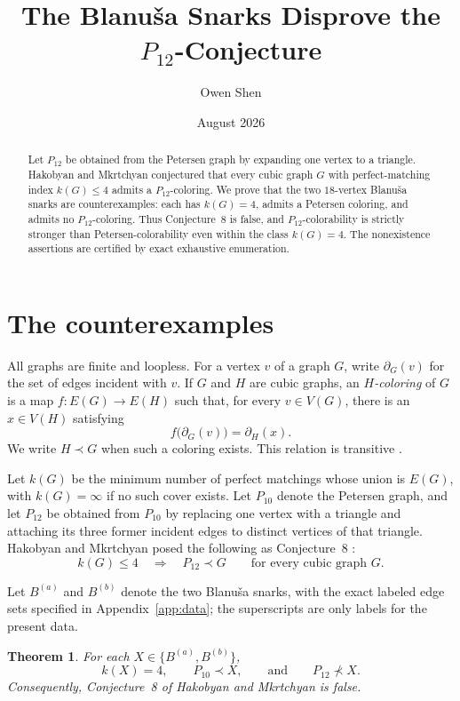 \documentclass[11pt]{amsart}
\title{The Blanu\v{s}a Snarks Disprove the
\texorpdfstring{$P_{12}$}{P12}-Conjecture}
\author{Owen Shen}
\date{August 2026}
\newtheorem{theorem}{Theorem}
\newcommand{\Pten}{P_{10}}
\newcommand{\Ptwelve}{P_{12}}
\newcommand{\Ba}{B^{(a)}}
\newcommand{\Bb}{B^{(b)}}
\begin{document}
\begin{abstract}
Let $P_{12}$ be obtained from the Petersen graph by expanding one vertex to a
triangle. Hakobyan and Mkrtchyan conjectured that every cubic graph $G$ with
perfect-matching index $k(G)\leq4$ admits a $P_{12}$-coloring. We prove that
the two $18$-vertex Blanu\v{s}a snarks are counterexamples: each has
$k(G)=4$, admits a Petersen coloring, and admits no $P_{12}$-coloring. Thus
Conjecture~8 is false, and $P_{12}$-colorability is strictly stronger than
Petersen-colorability even within the class $k(G)=4$. The nonexistence
assertions are certified by exact exhaustive enumeration.
\end{abstract}

\maketitle

\section{The counterexamples}

All graphs are finite and loopless. For a vertex $v$ of a graph $G$, write
$\partial_G(v)$ for the set of edges incident with $v$. If $G$ and $H$ are
cubic graphs, an \emph{$H$-coloring} of $G$ is a map
$f:E(G)\to E(H)$ such that, for every $v\in V(G)$, there is an
$x\in V(H)$ satisfying
\[
  f\bigl(\partial_G(v)\bigr)=\partial_H(x).
\]
We write $H\prec G$ when such a coloring exists. This relation is transitive
\cite{HakobyanMkrtchyan2019}.

Let $k(G)$ be the minimum number of perfect matchings whose union is $E(G)$,
with $k(G)=\infty$ if no such cover exists. Let $\Pten$ denote the Petersen
graph, and let $\Ptwelve$ be obtained from $\Pten$ by replacing one vertex
with a triangle and attaching its three former incident edges to distinct
vertices of that triangle. Hakobyan and Mkrtchyan posed the following as
Conjecture~8 \cite{HakobyanMkrtchyan2019}:
\begin{equation}\label{eq:HM}
  k(G)\leq 4 \quad\Longrightarrow\quad \Ptwelve\prec G
  \qquad\text{for every cubic graph }G.
\end{equation}

Let $\Ba$ and $\Bb$ denote the two Blanu\v{s}a snarks, with the exact labeled
edge sets specified in Appendix~\ref{app:data}; the superscripts are only
labels for the present data.

\begin{theorem}\label{thm:main}
For each $X\in\{\Ba,\Bb\}$,
\[
  k(X)=4,\qquad \Pten\prec X,\qquad\text{and}\qquad
  \Ptwelve\not\prec X.
\]
Consequently, Conjecture~8 of Hakobyan and Mkrtchyan is false.
\end{theorem}
\end{document}
